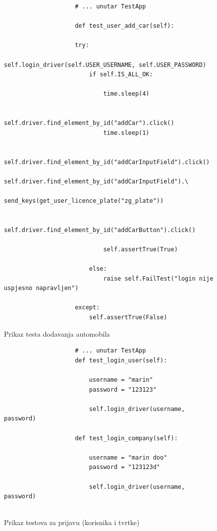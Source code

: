 			\begin{figure}[H]
								\begin{lstlisting}
					# ... unutar TestApp
					
					def test_user_add_car(self):
					
					try:
						self.login_driver(self.USER_USERNAME, self.USER_PASSWORD)
						if self.IS_ALL_OK:
						
							time.sleep(4)
							
							self.driver.find_element_by_id("addCar").click()
							time.sleep(1)
							
							self.driver.find_element_by_id("addCarInputField").click()
							self.driver.find_element_by_id("addCarInputField").\
								send_keys(get_user_licence_plate("zg_plate"))
							
							self.driver.find_element_by_id("addCarButton").click()
							
							self.assertTrue(True)
						
						else:
							raise self.FailTest("login nije uspjesno napravljen")
					
					except:
						self.assertTrue(False)
				\end{lstlisting}
			
				\centering
				\caption{Prikaz testa dodavanja automobila}
				\label{fig:test - sistemski - dodavanje automobila}
			\end{figure}			

			
			\begin{figure}[H]
								\begin{lstlisting}
					# ... unutar TestApp
	   				def test_login_user(self):
					
						username = "marin"
						password = "123123"
						
						self.login_driver(username, password)
						
  					def test_login_company(self):
						
						username = "marin doo"
						password = "123123d"
						
						self.login_driver(username, password)
						
				\end{lstlisting}
			
				\centering
				\caption{Prikaz testova za prijavu (korisnika i tvrtke)}
				\label{fig:test - sistemski - prijava}
			\end{figure}		

